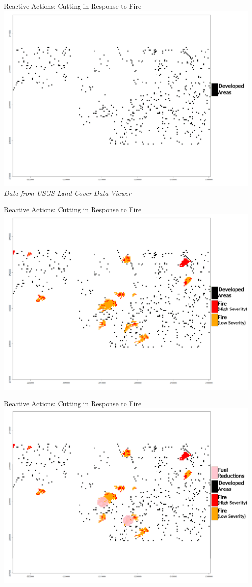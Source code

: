 \documentclass[xcolor=dvipsnames]{beamer}
\begin{document}
\begin{frame}{Reactive Actions: Cutting in Response to Fire}
\centering\includegraphics[width=.85\linewidth]{developAreaMap.png}
\newline
\scriptsize{\textit{Data from USGS Land Cover Data Viewer}}
\end{frame}

\begin{frame}{Reactive Actions: Cutting in Response to Fire}
\centering\includegraphics[width=.9\linewidth]{developAreaMapwithFire.png}
\end{frame}

\begin{frame}{Reactive Actions: Cutting in Response to Fire}
\centering\includegraphics[width=.9\linewidth]{developAreaMapwithFireAndThinning.png}
\end{frame}
\end{document}
